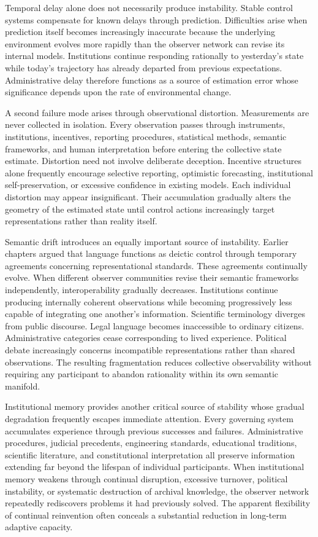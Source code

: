 \documentclass[12pt,a4paper]{article}
\begin{document}
Temporal delay alone does not necessarily produce instability. Stable control systems compensate for known delays through prediction. Difficulties arise when prediction itself becomes increasingly inaccurate because the underlying environment evolves more rapidly than the observer network can revise its internal models. Institutions continue responding rationally to yesterday's state while today's trajectory has already departed from previous expectations. Administrative delay therefore functions as a source of estimation error whose significance depends upon the rate of environmental change.

A second failure mode arises through observational distortion. Measurements are never collected in isolation. Every observation passes through instruments, institutions, incentives, reporting procedures, statistical methods, semantic frameworks, and human interpretation before entering the collective state estimate. Distortion need not involve deliberate deception. Incentive structures alone frequently encourage selective reporting, optimistic forecasting, institutional self-preservation, or excessive confidence in existing models. Each individual distortion may appear insignificant. Their accumulation gradually alters the geometry of the estimated state until control actions increasingly target representations rather than reality itself.

Semantic drift introduces an equally important source of instability. Earlier chapters argued that language functions as deictic control through temporary agreements concerning representational standards. These agreements continually evolve. When different observer communities revise their semantic frameworks independently, interoperability gradually decreases. Institutions continue producing internally coherent observations while becoming progressively less capable of integrating one another's information. Scientific terminology diverges from public discourse. Legal language becomes inaccessible to ordinary citizens. Administrative categories cease corresponding to lived experience. Political debate increasingly concerns incompatible representations rather than shared observations. The resulting fragmentation reduces collective observability without requiring any participant to abandon rationality within its own semantic manifold.

Institutional memory provides another critical source of stability whose gradual degradation frequently escapes immediate attention. Every governing system accumulates experience through previous successes and failures. Administrative procedures, judicial precedents, engineering standards, educational traditions, scientific literature, and constitutional interpretation all preserve information extending far beyond the lifespan of individual participants. When institutional memory weakens through continual disruption, excessive turnover, political instability, or systematic destruction of archival knowledge, the observer network repeatedly rediscovers problems it had previously solved. The apparent flexibility of continual reinvention often conceals a substantial reduction in long-term adaptive capacity.
\end{document}
